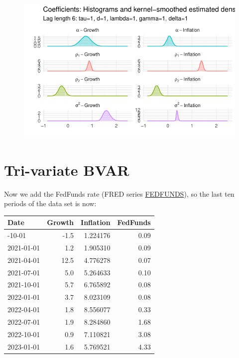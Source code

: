 \documentclass[
  letterpaper,
]{book}
\begin{document}
\begin{figure}

{\centering \includegraphics{BVAR_files/figure-pdf/unnamed-chunk-9-4.pdf}

}

\end{figure}

\hypertarget{tri-variate-bvar}{%
\section{Tri-variate BVAR}\label{tri-variate-bvar}}

Now we add the FedFunds rate (FRED series
\href{https://fred.stlouisfed.org/series/FEDFUNDS}{FEDFUNDS}), so the
last ten periods of the data set is now:

\begin{longtable}[]{@{}lrrr@{}}
\toprule\noalign{}
Date & Growth & Inflation & FedFunds \\
\midrule\noalign{}
\endhead
\bottomrule\noalign{}
\endlastfoot
2020-10-01 & -1.5 & 1.224176 & 0.09 \\
2021-01-01 & 1.2 & 1.905310 & 0.09 \\
2021-04-01 & 12.5 & 4.776278 & 0.07 \\
2021-07-01 & 5.0 & 5.264633 & 0.10 \\
2021-10-01 & 5.7 & 6.765892 & 0.08 \\
2022-01-01 & 3.7 & 8.023109 & 0.08 \\
2022-04-01 & 1.8 & 8.556077 & 0.33 \\
2022-07-01 & 1.9 & 8.284860 & 1.68 \\
2022-10-01 & 0.9 & 7.110821 & 3.08 \\
2023-01-01 & 1.6 & 5.769521 & 4.33 \\
\end{longtable}
\end{document}

